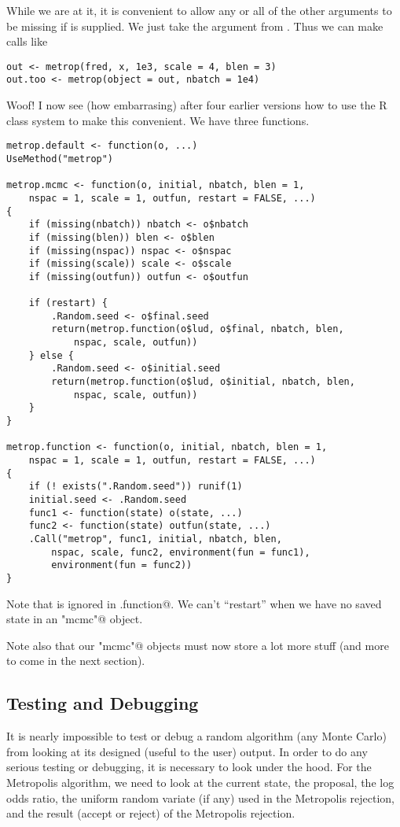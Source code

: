 \documentclass{article}
\begin{document}
While we are at it, it is convenient to allow any or all of the other
arguments to be missing if \verb@object@ is supplied.  We just take
the argument from \verb@object@.  Thus we can make calls like
\begin{verbatim}
out <- metrop(fred, x, 1e3, scale = 4, blen = 3)
out.too <- metrop(object = out, nbatch = 1e4)
\end{verbatim}

Woof!  I now see (how embarrasing) after four earlier versions how to
use the R class system to make this convenient.  We have three functions.
\begin{verbatim}
metrop.default <- function(o, ...)
UseMethod("metrop")

metrop.mcmc <- function(o, initial, nbatch, blen = 1,
    nspac = 1, scale = 1, outfun, restart = FALSE, ...)
{
    if (missing(nbatch)) nbatch <- o$nbatch
    if (missing(blen)) blen <- o$blen
    if (missing(nspac)) nspac <- o$nspac
    if (missing(scale)) scale <- o$scale
    if (missing(outfun)) outfun <- o$outfun

    if (restart) {
        .Random.seed <- o$final.seed
        return(metrop.function(o$lud, o$final, nbatch, blen,
            nspac, scale, outfun))
    } else {
        .Random.seed <- o$initial.seed
        return(metrop.function(o$lud, o$initial, nbatch, blen,
            nspac, scale, outfun))
    }
}

metrop.function <- function(o, initial, nbatch, blen = 1,
    nspac = 1, scale = 1, outfun, restart = FALSE, ...)
{
    if (! exists(".Random.seed")) runif(1)
    initial.seed <- .Random.seed
    func1 <- function(state) o(state, ...)
    func2 <- function(state) outfun(state, ...)
    .Call("metrop", func1, initial, nbatch, blen,
        nspac, scale, func2, environment(fun = func1),
        environment(fun = func2))
}
\end{verbatim}
Note that \verb@restart@ is ignored in \verb@metrop.function@.
We can't ``restart'' when we have no saved state in an \verb@"mcmc"@
object.

Note also that our \verb@"mcmc"@ objects must now store a lot more stuff
(and more to come in the next section).

\subsection{Testing and Debugging}

It is nearly impossible to test or debug a random algorithm
(any Monte Carlo) from looking at its designed (useful to the user)
output.  In order to do any serious testing or debugging, it is necessary
to look under the hood.  For the Metropolis algorithm, we need to look
at the current state, the proposal, the log odds ratio, the uniform
random variate (if any) used in the Metropolis rejection, and the
result (accept or reject) of the Metropolis rejection.
\end{document}
